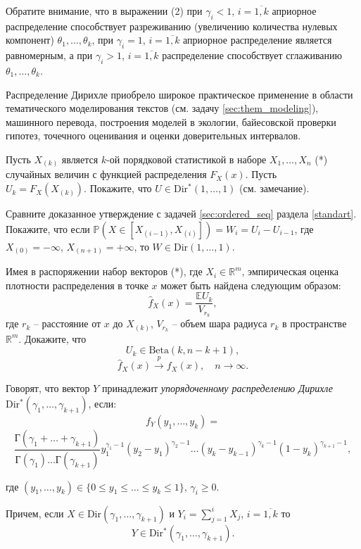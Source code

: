\begin{remark}
Обратите внимание, что в выражении (2)  при $\gamma_i < 1$, $i = \overline{1,k}$ априорное распределение способствует разреживанию (увеличению количества нулевых компонент) $\theta_1,\ldots,\theta_k$, при  $\gamma_i = 1$, $i = \overline{1,k}$ априорное распределение является равномерным, а при  $\gamma_i > 1$, $i = \overline{1,k}$ распределение способствует сглаживанию $\theta_1,\ldots,\theta_k$.

Распределение Дирихле приобрело широкое практическое применение в области  тематического моделирования текстов (см. задачу \ref{sec:them_modeling}), машинного перевода, построения моделей в экологии, байесовской проверки гипотез, точечного оценивания и оценки доверительных интервалов. 
\end{remark}

\begin{problem}
Пусть $X_{(k)}$ является $k$-ой порядковой статистикой в наборе $X_1, \ldots, X_n$ (*) случайных величин с функцией распределения $F_X(x)$. Пусть $U_k = F_X(X_{(k)}).$ Покажите, что $U \in \mathrm{Dir^*}(1, \ldots, 1)$ (см. замечание).

Сравните доказанное утверждение с задачей \ref{sec:ordered_seq} раздела \ref{standart}. 
Покажите, что если $\mathbb{P}(X \in [X_{(i-1)}, X_{(i)}]) = W_i = U_i - U_{i-1}$, где $X_{(0)} = -\infty$, $X_{(n+1)} = +\infty$, то 
$W \in \mathrm{Dir}(1, \ldots, 1)$.
 
Имея в распоряжении набор векторов (*), где $X_i \in \mathbb{R}^m$, эмпирическая оценка плотности распределения в точке $x$ может быть найдена следующим образом:
\[
\widehat{f}_X(x) = \frac{\mathbb{E}U_k}{V_{r_k}},
\]    
где $r_k$ -- расстояние от $x$ до $X_{(k)}$, $V_{r_k}$ -- объем шара радиуса $r_k$ в пространстве $\mathbb{R}^m$. Докажите, что  
\[
U_k \in \mathrm{Beta}(k, n-k+1), 
\]
\[
\widehat{f}_X(x) \xrightarrow{p} f_X(x), \quad
n \to \infty.
\]    


\end{problem}


\begin{remark}

Говорят, что вектор $Y$ принадлежит \textit{упорядоченному распределению Дирихле} $\mathrm{Dir^*}(\gamma_1, \ldots, \gamma_{k+1})$, если: 
\[
f_{Y}(y_1, \ldots, y_k) = \]
\[ \frac{\text{Г}(\gamma_1 +  \ldots + \gamma_{k+1})}{\text{Г}(\gamma_1)  \ldots  \text{Г}(\gamma_{k+1})} y_1^{\gamma_1-1}(y_2 - y_1)^{\gamma_2-1} \ldots (y_k - y_{k-1})^{\gamma_k-1} (1 - y_k)^{\gamma_{k+1}-1},
\] 

\noindent где  $(y_1, \ldots, y_k) \in \{ 0 \leq y_1 \leq \ldots \leq  y_k \leq 1 \}$, $\gamma_i \geq 0$.

Причем, если $X \in \mathrm{Dir}(\gamma_1, \ldots, \gamma_{k+1})$ и $Y_i = \sum \limits_{j=1}^{i} X_j$, $i = \overline{1,k}$ то 
\[
Y \in \mathrm{Dir^*}(\gamma_1, \ldots, \gamma_{k+1}).
\]

\end{remark}


